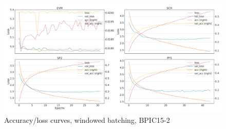 \begin{figure}[!htb]
    \centering
    \includegraphics[width=\textwidth]{gfx/bpic2015_2/windowed_loss_acc_curve.pdf}
    \caption{Accuracy/loss curves, windowed batching, BPIC15-2}
\end{figure}
\FloatBarrier

